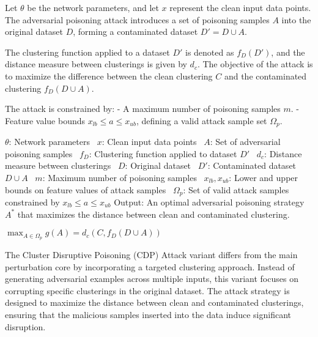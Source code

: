 Let \( \theta \) be the network parameters, and let \( x \) represent the clean input data points. The adversarial poisoning attack introduces a set of poisoning samples \( A \) into the original dataset \( D \), forming a contaminated dataset \( D' = D \cup A \). 

The clustering function applied to a dataset \( D' \) is denoted as \( f_D(D') \), and the distance measure between clusterings is given by \( d_c \). The objective of the attack is to maximize the difference between the clean clustering \( C \) and the contaminated clustering \( f_D(D \cup A) \).

The attack is constrained by:
- A maximum number of poisoning samples \( m \).
- Feature value bounds \( x_{lb} \leq a \leq x_{ub} \), defining a valid attack sample set \( \Omega_p \).


$\theta$: Network parameters \ $x$: Clean input data points \ $A$: Set of adversarial poisoning samples \ $f_D$: Clustering function applied to dataset $D'$ \ $d_c$: Distance measure between clusterings \ $D$: Original dataset \ $D'$: Contaminated dataset $D \cup A$ \ $m$: Maximum number of poisoning samples \ $x_{lb}, x_{ub}$: Lower and upper bounds on feature values of attack samples \ $\Omega_p$: Set of valid attack samples constrained by $x_{lb} \leq a \leq x_{ub}$
Output: An optimal adversarial poisoning strategy $A^*$ that maximizes the distance between clean and contaminated clustering.

$\max_{A \in \Omega_p} g(A) = d_c(C, f_D(D \cup A))$

The Cluster Disruptive Poisoning (CDP) Attack variant differs from the main perturbation core by incorporating a targeted clustering approach. Instead of generating adversarial examples across multiple inputs, this variant focuses on corrupting specific clusterings in the original dataset. The attack strategy is designed to maximize the distance between clean and contaminated clusterings, ensuring that the malicious samples inserted into the data induce significant disruption.